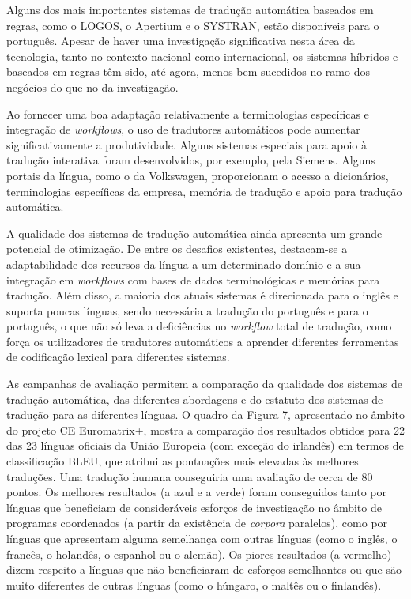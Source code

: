 \begin{multicols}{2}
Alguns dos mais importantes sistemas de tradução automática baseados em regras, como o LOGOS, o Apertium e o SYSTRAN, estão disponíveis para o português. Apesar de haver uma investigação significativa nesta área da tecnologia, tanto no contexto nacional como internacional, os sistemas híbridos e baseados em regras têm sido, até agora, menos bem sucedidos no ramo dos negócios do que no da investigação. 

Ao fornecer uma boa adaptação relativamente a terminologias específicas e integração de \textit{workflows}, o uso de tradutores automáticos pode aumentar significativamente a produtividade. Alguns sistemas especiais para apoio à tradução interativa foram desenvolvidos, por exemplo, pela Siemens. Alguns portais da língua, como o da Volkswagen, proporcionam o acesso a dicionários, terminologias específicas da empresa, memória de tradução e apoio para tradução automática.

A qualidade dos sistemas de tradução automática ainda apresenta um grande potencial de otimização. De entre os desafios existentes, destacam-se a adaptabilidade dos recursos da língua a um determinado domínio e a sua integração em \textit{workflows} com bases de dados terminológicas e memórias para tradução. Além disso, a maioria dos atuais sistemas é direcionada para o inglês e suporta poucas línguas, sendo necessária a tradução do português e para o português, o que não só leva a deficiências no \textit{workflow} total de tradução, como força os utilizadores de tradutores automáticos a aprender diferentes ferramentas de codificação lexical para diferentes sistemas. 

As campanhas de avaliação permitem a comparação da qualidade dos sistemas de tradução automática, das diferentes abordagens e do estatuto dos sistemas de tradução para as diferentes línguas. O quadro da Figura 7, apresentado no âmbito do projeto CE Euromatrix+, mostra a comparação dos resultados obtidos para 22 das 23 línguas oficiais da União Europeia (com exceção do irlandês) em termos de classificação BLEU, que atribui as pontuações mais elevadas às melhores traduções\cite{papieni}.  Uma tradução humana conseguiria uma avaliação de cerca de 80 pontos.
Os melhores resultados (a azul e a verde) foram conseguidos tanto por línguas que beneficiam de consideráveis esforços de investigação no âmbito de programas coordenados (a partir da existência de \textit{corpora} paralelos), como por línguas que apresentam alguma semelhança com outras línguas (como o inglês, o francês, o holandês, o espanhol ou o alemão). Os piores resultados (a vermelho) dizem respeito a línguas que não beneficiaram de esforços semelhantes ou que são muito diferentes de outras línguas (como o húngaro, o maltês ou o finlandês).


\end{multicols}
